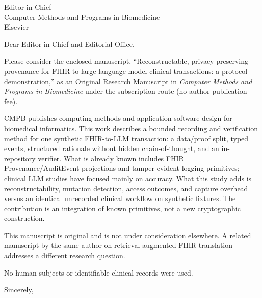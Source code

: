 \documentclass[10pt]{letter}
\date{September 29, 2026}
\renewcommand*{\opening}[1]{\vspace*{-1.2em}{\raggedright \toname \\ \toaddress
  \vspace{1.2em}\par}%
  \noindent #1\par\vspace{0.6em}}
\begin{document}
\begin{letter}{Editor-in-Chief\\
Computer Methods and Programs in Biomedicine\\
Elsevier}

\opening{Dear Editor-in-Chief and Editorial Office,}

Please consider the enclosed manuscript, ``Reconstructable, privacy-preserving provenance for FHIR-to-large language model clinical transactions: a protocol demonstration,'' as an Original
Research Manuscript in \emph{Computer Methods and Programs in Biomedicine}
under the subscription route (no author publication fee).

CMPB publishes computing methods and application-software design for
biomedical informatics. This work describes a bounded recording and
verification method for one synthetic FHIR-to-LLM transaction: a data/proof
split, typed events, structured rationale without hidden chain-of-thought,
and an in-repository verifier. What is already known includes FHIR
Provenance/AuditEvent projections and tamper-evident logging primitives;
clinical LLM studies have focused mainly on accuracy. What this study adds
is reconstructability, mutation detection, access outcomes, and capture
overhead versus an identical unrecorded clinical workflow on synthetic
fixtures. The contribution is an integration of known primitives, not a new
cryptographic construction.

This manuscript is original and is not under consideration elsewhere. A
related manuscript by the same author on retrieval-augmented FHIR
translation addresses a different research question.

No human subjects or identifiable clinical records were used.

\closing{Sincerely,}

\end{letter}
\end{document}
